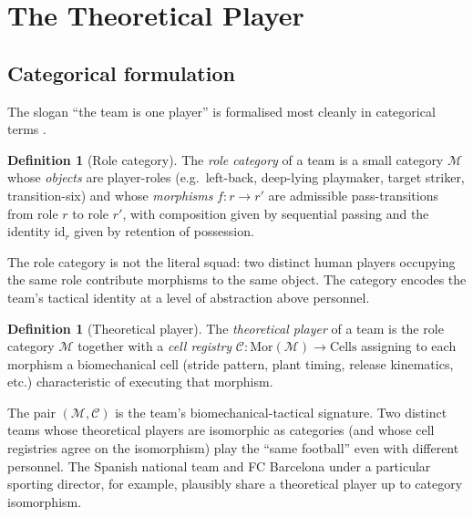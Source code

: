 \documentclass[11pt,twocolumn,a4paper]{article}
\theoremstyle{definition}
\newtheorem{definition}[theorem]{Definition}
\theoremstyle{remark}
\newcommand{\Ccal}{\mathcal{C}}
\newcommand{\Mcal}{\mathcal{M}}
\begin{document}
\section{The Theoretical Player}
\label{sec:theoretical}

\subsection{Categorical formulation}

The slogan ``the team is one player'' is formalised most cleanly in
categorical terms \citep{maclane1971,awodey2010,spivak2014}.

\begin{definition}[Role category]
\label{def:rolecat}
The \emph{role category} of a team is a small category $\Mcal$ whose
\emph{objects} are player-roles (e.g.\ left-back, deep-lying playmaker,
target striker, transition-six) and whose \emph{morphisms}
$f: r \to r'$ are admissible pass-transitions from role $r$ to role
$r'$, with composition given by sequential passing and the identity
$\mathrm{id}_r$ given by retention of possession.
\end{definition}

The role category is not the literal squad: two distinct human players
occupying the same role contribute morphisms to the same object. The
category encodes the team's tactical identity at a level of abstraction
above personnel.

\begin{definition}[Theoretical player]
\label{def:theoretical}
The \emph{theoretical player} of a team is the role category $\Mcal$
together with a \emph{cell registry} $\Ccal : \mathrm{Mor}(\Mcal) \to
\mathrm{Cells}$ assigning to each morphism a biomechanical cell
(stride pattern, plant timing, release kinematics, etc.) characteristic
of executing that morphism.
\end{definition}

The pair $(\Mcal, \Ccal)$ is the team's biomechanical-tactical signature.
Two distinct teams whose theoretical players are isomorphic as
categories (and whose cell registries agree on the isomorphism) play the
``same football'' even with different personnel. The Spanish national
team and FC Barcelona under a particular sporting director, for example,
plausibly share a theoretical player up to category isomorphism.
\end{document}

